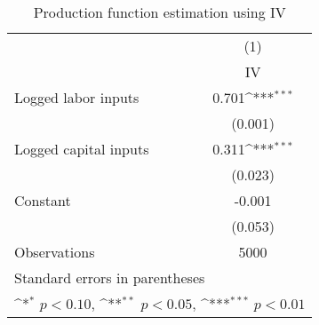 \begin{table}[htbp]\centering
\def\sym#1{\ifmmode^{#1}\else\(^{#1}\)\fi}
\caption{Production function estimation using IV}
\begin{tabular}{l*{1}{c}}
\hline\hline
                &\multicolumn{1}{c}{(1)}\\
                &\multicolumn{1}{c}{IV}\\
\hline
Logged labor inputs&    0.701\sym{***}\\
                &  (0.001)         \\
Logged capital inputs&    0.311\sym{***}\\
                &  (0.023)         \\
Constant        &   -0.001         \\
                &  (0.053)         \\
\hline
Observations    &     5000         \\
\hline\hline
\multicolumn{2}{l}{\footnotesize Standard errors in parentheses}\\
\multicolumn{2}{l}{\footnotesize \sym{*} \(p<0.10\), \sym{**} \(p<0.05\), \sym{***} \(p<0.01\)}\\
\end{tabular}
\end{table}
